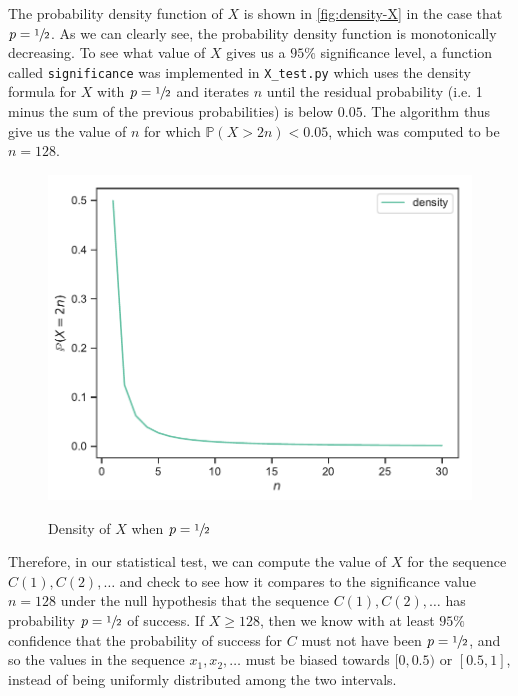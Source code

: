 \documentclass{article}
\renewcommand{\geq}{\geqslant}
\begin{document}
\begin{enumerate}
        The probability density function of $X$ is shown in \autoref{fig:density-X} in the case that $p = \sfrac{1}{2}$.
        As we can clearly see, the probability density function is monotonically decreasing.
        To see what value of $X$ gives us a $95\%$ significance level, a function called \texttt{significance} was implemented in \texttt{X\_test.py}
        which uses the density formula for $X$ with $p = \sfrac{1}{2}$ and iterates $n$ until the residual probability
        (i.e. 1 minus the sum of the previous probabilities) is below $0.05$.
        The algorithm thus give us the value of $n$ for which $\mathbb{P}(X > 2n) < 0.05$, which was computed to be $n = 128$.

        \begin{figure}[H]
            \centering
            \caption{Density of $X$ when $p = \sfrac{1}{2}$}
            \includegraphics[scale=1]{../figures/X.pdf}
            \label{fig:density-X}
        \end{figure}

        Therefore, in our statistical test, we can compute the value of $X$ for the sequence $C(1), C(2), \dots$
        and check to see how it compares to the significance value $n = 128$ under the
        null hypothesis that the sequence $C(1), C(2), \dots$ has probability $p = \sfrac{1}{2}$ of success.
        If $X \geq 128$, then we know with at least $95\%$ confidence that the probability of success for $C$ must not have been $p = \sfrac{1}{2}$,
        and so the values in the sequence $x_1, x_2, \dots$ must be biased towards $[0, 0.5)$ or $[0.5, 1]$, instead of being uniformly distributed among the two intervals.


\end{enumerate}
\end{document}
